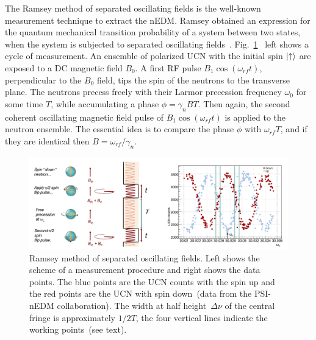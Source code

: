 The Ramsey method of separated oscillating fields is the well-known
measurement technique to extract the nEDM. Ramsey obtained an
expression for the quantum mechanical transition probability of a
system between two states, when the system is subjected to separated
oscillating
fields~\cite{ramsey1950}. Fig.~\ref{fig:ramsey}~\cite{Schmidt2016}
left shows a cycle of measurement. An ensemble of polarized UCN with
the initial spin $\ket{ \uparrow}$ are exposed to a DC magnetic field
$B_0$.  A first RF pulse $B_1 \cos (\omega_{rf}t)$, perpendicular to
the $B_0$ field, tips the spin of the neutrons to the transverse
plane. The neutrons precess freely with their Larmor precession
frequency $\omega_0$ for some time $T$, while accumulating a phase
$\phi = \gamma_n BT$. Then again, the second coherent oscillating
magnetic field pulse of $B_1 \cos (\omega_{rf}t)$ is applied to the
neutron ensemble. The essential idea is to compare the phase $\phi$
with $\omega_{rf}T$, and if they are identical then
$B= \omega_{rf} / \gamma_n$.

\begin{figure}[h]
  \centering
  \includegraphics[width=1.0\textwidth]{ramsey.png}
  \caption[Ramsey cycle]{\cite{Schmidt-Wellenburg:2016nfv} Ramsey
    method of separated oscillating fields. Left shows the scheme of a
    measurement procedure and right shows the data points. The blue
    points are the UCN counts with the spin up and the red points are
    the UCN with spin down~(data from the PSI-nEDM collaboration). The
    width at half height~$\Delta \nu$ of the central fringe is
    approximately $1/2T$, the four vertical lines indicate the working
    points~(see text).}
  \label{fig:ramsey}
\end{figure}

